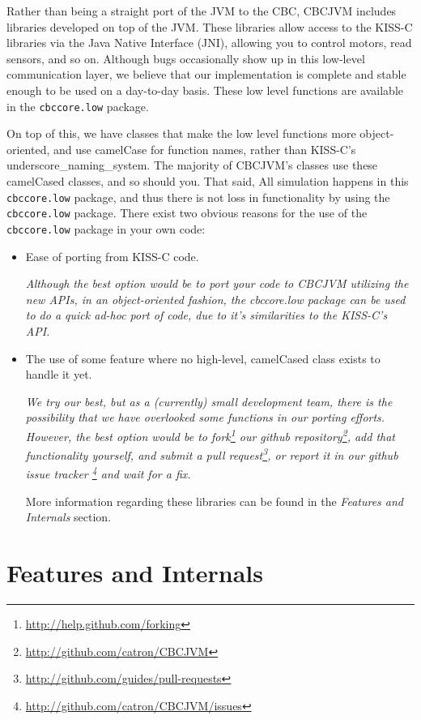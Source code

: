 \documentclass[12pt,letterpaper]{article}
\newcommand{\urlfootnote}[1]{\footnote{\url{#1}}}
\begin{document}
Rather than being a straight port of the JVM to the CBC, CBCJVM includes libraries developed on top of the JVM. These libraries allow access to the KISS-C libraries via the Java Native Interface (JNI), allowing you to control motors, read sensors, and so on. Although bugs occasionally show up in this low-level communication layer, we believe that our implementation is complete and stable enough to be used on a day-to-day basis. These low level functions are available in the \texttt{cbccore.low} package.

On top of this, we have classes that make the low level functions more object-oriented, and use camelCase for function names, rather than KISS-C's underscore{\_}naming{\_}system. The majority of CBCJVM's classes use these camelCased classes, and so should you. That said, All simulation happens in this \texttt{cbccore.low} package, and thus there is not loss in functionality by using the \texttt{cbccore.low} package. There exist two obvious reasons for the use of the \texttt{cbccore.low} package in your own code:
\begin{itemize}
\item Ease of porting from KISS-C code.

\textit{Although the best option would be to port your code to CBCJVM utilizing the new APIs, in an object-oriented fashion, the \textit{cbccore.low} package can be used to do a quick ad-hoc port of code, due to it's similarities to the KISS-C's API.}

\item The use of some feature where no high-level, camelCased class exists to handle it yet.

\textit{We try our best, but as a (currently) small development team, there is the possibility that we have overlooked some functions in our porting efforts. However, the best option would be to fork\urlfootnote{http://help.github.com/forking} our github repository\urlfootnote{http://github.com/catron/CBCJVM}, add that functionality yourself, and submit a pull request\urlfootnote{http://github.com/guides/pull-requests}, or report it in our github issue tracker \urlfootnote{http://github.com/catron/CBCJVM/issues} and wait for a fix.}

More information regarding these libraries can be found in the \textit{Features and Internals} section.
\end{itemize}



\pagebreak
\section{Features and Internals}
\end{document}
